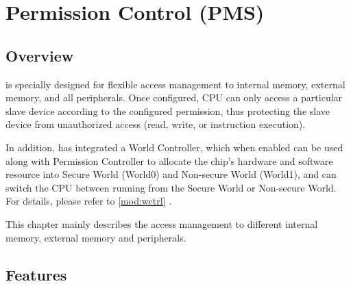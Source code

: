 \documentclass[main\_\_EN.tex]{subfiles}
\begin{document}

\ifglobal
\else
    {\let\clearpage\relax \listoftodos}
    \tableofcontents
    \listoftables
    \listoffigures
\fi



\hypertarget{permctrl}{}
\chapter{Permission Control (PMS)}
\label{mod:permctrl}
\section{Overview}

\chipname{} is specially designed for flexible access management to internal memory, external memory, and all peripherals. Once configured, CPU can only access a particular slave device according to the configured permission, thus protecting the slave device from unauthorized access (read, write, or instruction execution).

In addition, \chipname{} has integrated a World Controller, which when enabled can be used along with Permission Controller to allocate the chip's hardware and software resource into Secure World (World0) and Non-secure World (World1), and can switch the CPU between running from the Secure World or Non-secure World. For details, please refer to \ref{mod:wctrl} \textit{}.

This chapter mainly describes the access management to different internal memory, external memory and peripherals.

\section{Features}
\end{document}

